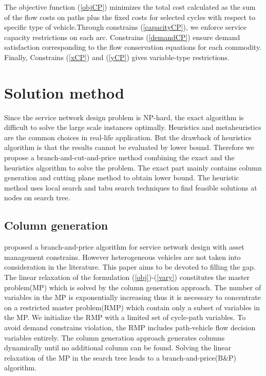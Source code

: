 \documentclass[11pt,nonblindrev,fleqn]{article}
\begin{document}
The objective function (\ref{objCP}) minimizes the total cost calculated as the sum of the flow costs on paths plus the fixed costs for selected cycles with respect to specific type of vehicle.Through constrains (\ref{capacityCP}), we enforce service capacity restrictions on each arc. Constrains (\ref{demandCP}) ensure demand satisfaction corresponding to the flow conservation equations for each commodity.  Finally, Constrains (\ref{xCP}) and (\ref{yCP}) gives variable-type restrictions.

\section{Solution method}
Since the service network design problem is NP-hard, the exact algorithm is difficult to solve the large scale instances optimally. Heuristics and metaheuristics are the common choices in real-life application. But the drawback of heuristics algorithm is that the results cannot be evaluated by lower bound. Therefore we propose a branch-and-cut-and-price method combining the exact and the heuristics algorithm to solve the problem. The exact part mainly contains column generation and cutting plane method to obtain lower bound. The heuristic method uses local search and tabu search techniques to find feasible solutions at nodes on search tree.

\subsection{Column generation}
\cite{Andersen2011Branch} proposed a branch-and-price algorithm for service network design with asset management constrains. However heterogeneous vehicles are not taken into consideration in the literature. This paper aims to be devoted to filling the gap.
The linear relaxation of the formulation (\ref{obj})-(\ref{vary}) constitutes the master problem(MP) which is solved by the column generation approach. The number of variables in the MP is exponentially increasing thus it is necessary to concentrate on a restricted master problem(RMP) which contain only a subset of variables in the MP. We initialize the RMP with a limited set of cycle-path variables. To avoid demand constrains violation, the RMP includes path-vehicle flow decision variables entirely. The column generation approach generates columns dynamically until no additional column can be found. Solving the linear relaxation of the MP in the search tree leads to a branch-and-price(B\&P) algorithm.
\end{document}
